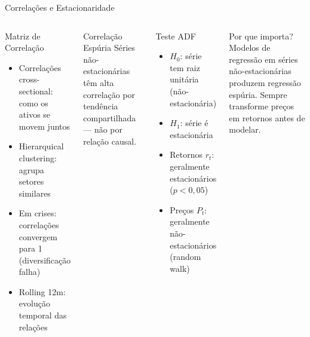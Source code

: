 \documentclass[aspectratio=169,12pt]{beamer}
\begin{document}
\begin{frame}[fragile]{Correlações e Estacionaridade}
\begin{columns}[T]
\begin{block}{Matriz de Correlação}
\begin{itemize}
  \item Correlações cross-sectional: como os ativos se movem juntos
  \item Hierarquical clustering: agrupa setores similares
  \item Em crises: correlações convergem para 1 (diversificação falha)
  \item Rolling 12m: evolução temporal das relações
\end{itemize}
\end{block}\vspace{.3em}
\begin{alertblock}{Correlação Espúria}
Séries não-estacionárias têm alta correlação por tendência compartilhada — não por relação causal.
\end{alertblock}
\begin{block}{Teste ADF}
\begin{itemize}
  \item $H_0$: série tem raiz unitária (não-estacionária)
  \item $H_1$: série é estacionária
  \item Retornos $r_t$: geralmente estacionários ($p < 0{,}05$)
  \item Preços $P_t$: geralmente não-estacionários (random walk)
\end{itemize}
\end{block}\vspace{.3em}
\begin{exampleblock}{Por que importa?}
Modelos de regressão em séries não-estacionárias produzem regressão espúria. Sempre transforme preços em retornos antes de modelar.
\end{exampleblock}
\end{columns}
\end{frame}
\end{document}
